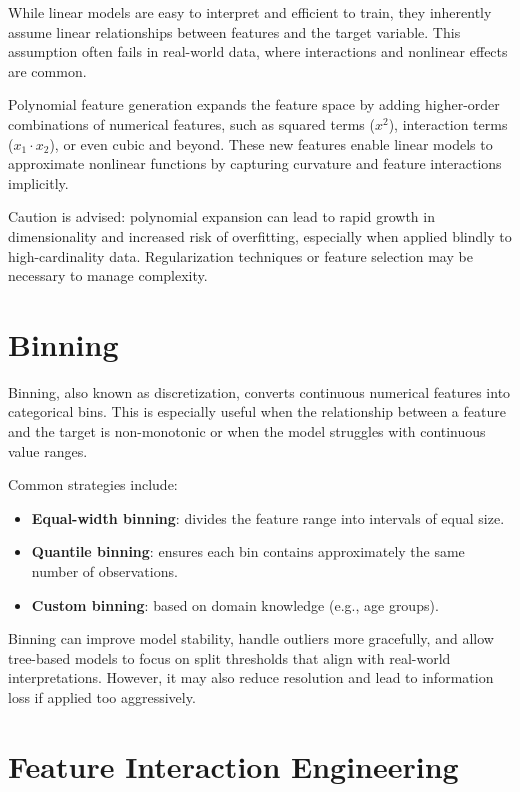 \documentclass[12pt,openany, draft]{book}
\begin{document}
While linear models are easy to interpret and efficient to train, they inherently assume linear relationships between features and the target variable. This assumption often fails in real-world data, where interactions and nonlinear effects are common.

Polynomial feature generation expands the feature space by adding higher-order combinations of numerical features, such as squared terms (\(x^2\)), interaction terms (\(x_1 \cdot x_2\)), or even cubic and beyond. These new features enable linear models to approximate nonlinear functions by capturing curvature and feature interactions implicitly.

Caution is advised: polynomial expansion can lead to rapid growth in dimensionality and increased risk of overfitting, especially when applied blindly to high-cardinality data. Regularization techniques or feature selection may be necessary to manage complexity.



\section{Binning}

Binning, also known as discretization, converts continuous numerical features into categorical bins. This is especially useful when the relationship between a feature and the target is non-monotonic or when the model struggles with continuous value ranges.

Common strategies include:
\begin{itemize}
    \item \textbf{Equal-width binning}: divides the feature range into intervals of equal size.
    \item \textbf{Quantile binning}: ensures each bin contains approximately the same number of observations.
    \item \textbf{Custom binning}: based on domain knowledge (e.g., age groups).
\end{itemize}

Binning can improve model stability, handle outliers more gracefully, and allow tree-based models to focus on split thresholds that align with real-world interpretations. However, it may also reduce resolution and lead to information loss if applied too aggressively.



\section{Feature Interaction Engineering}
\end{document}
